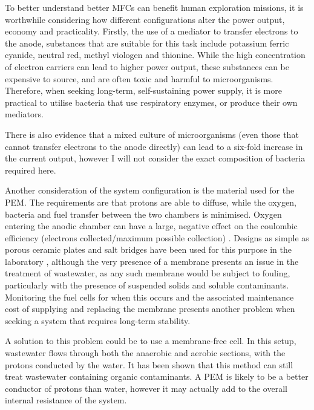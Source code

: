 \documentclass[12pt]{article}
\begin{document}
To better understand better MFCs can benefit human exploration missions, it is worthwhile considering how different configurations alter the power output, economy and practicality. Firstly, the use of a mediator to transfer electrons to the anode, substances that are suitable for this task include potassium ferric cyanide, neutral red, methyl viologen and thionine. While the high concentration of electron carriers can lead to higher power output, these substances can be expensive to source, and are often toxic and harmful to microorganisms.\cite{logan2006microbial} Therefore, when seeking long-term, self-sustaining power supply, it is more practical to utilise bacteria that use respiratory enzymes, or produce their own mediators.  \cite{min2004continuous} \cite{ghangrekar2006microbial}

There is also evidence that a mixed culture of microorganisms (even those that cannot transfer electrons to the anode directly) can lead to a six-fold increase in the current output, however I will not consider the exact composition of bacteria required here.\cite{ghangrekar2006microbial}

Another consideration of the system configuration is the material used for the PEM. The requirements are that protons are able to diffuse, while the oxygen, bacteria and fuel transfer between the two chambers is minimised. Oxygen entering the anodic chamber can have a large, negative effect on the coulombic efficiency (electrons collected/maximum possible collection) \cite{logan2006microbial}.  Designs as simple as porous ceramic plates and salt bridges have been used for this purpose in the laboratory \cite{min2005electricity}, although the very presence of a membrane presents an issue in the treatment of wastewater, as any such membrane would be subject to fouling, particularly with the presence of suspended solids and soluble contaminants. Monitoring the fuel cells for when this occurs and the associated maintenance cost of supplying and replacing the membrane presents another problem when seeking a system that requires long-term stability. 

A solution to this problem could be to use a membrane-free cell. In this setup, wastewater flows through both the anaerobic and aerobic sections, with the protons conducted by the water. It has been shown that this method can still treat wastewater containing organic contaminants. A PEM is likely to be a better conductor of protons than water, however it may actually add to the overall internal resistance of the system. \cite{ghangrekar2006wastewater,logan2005simultaneous}
\end{document}
